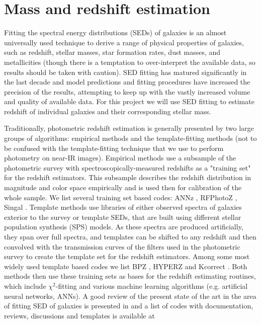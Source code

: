 \chapter{Mass and redshift estimation}\label{CH_03}

Fitting the spectral energy distributions (SEDs) of galaxies is an almost universally used technique to derive a range of physical properties of galaxies, such as redshift, stellar masses, star formation rates, dust masses, and metallicities (though there is a temptation to over-interpret the available data, so results should be taken with caution). SED fitting has matured significantly in the last decade and model predictions and fitting procedures have increased the precision of the results, attempting to keep up with the vastly increased volume and quality of available data. For this project we will use SED fitting to estimate redshift of individual galaxies and their corresponding stellar mass.

Traditionally, photometric redshift estimation is generally presented by two large groups of algorithms: empirical methods and the template-fitting methods (not to be confused with the template-fitting technique that we use to perform photometry on near-IR images). Empirical methods use a subsample of the photometric survey with spectroscopically-measured redshifts as a "training set" for the redshift estimators. This subsample describes the redshift distribution in magnitude and color space empirically and is used then for calibration of the whole sample. We list several training set based codes: ANNz \citep{2004PASP..116..345C}, RFPhotoZ \citep{2008ASPC..394..521C}, Singal \citep{2011PASP..123..615S}. Template methods use libraries of either observed spectra of galaxies exterior to the survey or template SEDs, that are built using different stellar population synthesis (SPS) models. As these spectra are produced artificially, they span over full spectra, and templates can be shifted to any redshift and then convolved with the transmission curves of the filters used in the photometric survey to create the template set for the redshift estimators. Among some most widely used template based codes we list BPZ \citep{2011ascl.soft08011B}, HYPERZ \citep{Bolzonella2011} and Kcorrect \citep{Blanton2017}. Both methods then use these training sets as bases for the redshift estimating routines, which include $\chi^{2}$-fitting and various machine learning algorithms (e.g. artificial neural networks, ANNs). A good review of the present state of the art in the area of fitting SED of galaxies is presented in \citep{Walcher2011} and a list of codes with documentation, reviews, discussions and templates is available at 

